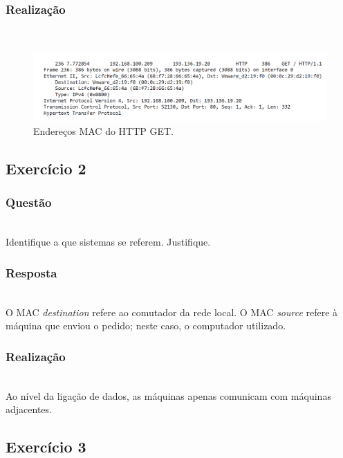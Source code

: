 \documentclass{llncs}
\begin{document}
\subsubsection{Realização}\rule[-10pt]{0pt}{10pt}\\

\begin{figure}
  \begin{center}
  \includegraphics[scale=0.35]{imagens/MACAddrGET.png} 
  \end{center}
  \caption{Endereços MAC do HTTP GET.}
  \label{fig:mac_addr}
\end{figure} 

\clearpage
\subsection{Exercício 2}
\subsubsection{Questão}\rule[-10pt]{0pt}{10pt}\\

Identifique a que sistemas se referem. Justifique.

\subsubsection{Resposta}\rule[-10pt]{0pt}{10pt}\\

O MAC \textit{destination} refere ao comutador da rede local.
O MAC \textit{source} refere à máquina que enviou o pedido; neste caso, o computador utilizado.

\subsubsection{Realização}\rule[-10pt]{0pt}{10pt}\\

Ao nível da ligação de dados, as máquinas apenas comunicam com máquinas adjacentes.

\clearpage
\subsection{Exercício 3}
\end{document}
